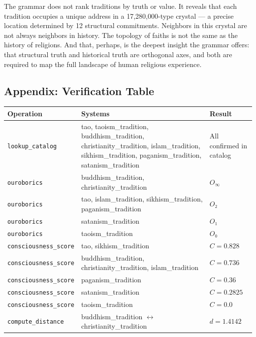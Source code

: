 \documentclass[12pt,a4paper]{article}
\begin{document}
The grammar does not rank traditions by truth or value. It reveals that each tradition occupies a unique address in a 17,280,000-type crystal --- a precise location determined by 12 structural commitments. Neighbors in this crystal are not always neighbors in history. The topology of faiths is not the same as the history of religions. And that, perhaps, is the deepest insight the grammar offers: that structural truth and historical truth are orthogonal axes, and both are required to map the full landscape of human religious experience.

\subsection{Appendix: Verification Table}

\begin{table}[htbp]
\centering
\small
{}
\begin{tabularx}{\textwidth}{>{\centering\arraybackslash}X >{\centering\arraybackslash}X >{\centering\arraybackslash}X}
\toprule
\rowcolor{gray!25}\textbf{Operation} & \textbf{Systems} & \textbf{Result} \\
\midrule
\rowcolors{1}{white}{gray!10}
\texttt{lookup\_catalog} & tao, taoism\_tradition, buddhism\_tradition, christianity\_tradition, islam\_tradition, sikhism\_tradition, paganism\_tradition, satanism\_tradition & All confirmed in catalog \\
\texttt{ouroborics} & buddhism\_tradition, christianity\_tradition & $O_{\infty}$ \\
\texttt{ouroborics} & tao, islam\_tradition, sikhism\_tradition, paganism\_tradition & $O₂$ \\
\texttt{ouroborics} & satanism\_tradition & $O₁$ \\
\texttt{ouroborics} & taoism\_tradition & $O₀$ \\
\texttt{consciousness\_score} & tao, sikhism\_tradition & $C = 0.828$ \\
\texttt{consciousness\_score} & buddhism\_tradition, christianity\_tradition, islam\_tradition & $C = 0.736$ \\
\texttt{consciousness\_score} & paganism\_tradition & $C = 0.36$ \\
\texttt{consciousness\_score} & satanism\_tradition & $C = 0.2825$ \\
\texttt{consciousness\_score} & taoism\_tradition & $C = 0.0$ \\
\texttt{compute\_distance} & buddhism\_tradition $\leftrightarrow$ christianity\_tradition & $d = 1.4142$ \\

\end{tabularx}
\end{table}
\end{document}
